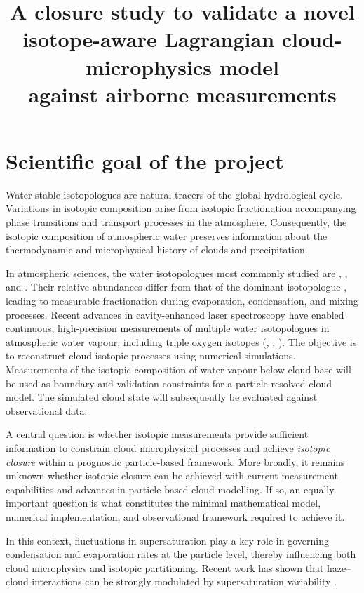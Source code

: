 \documentclass[12pt]{article}
\title{
    \textbf{A closure study to validate a novel isotope-aware
    Lagrangian cloud-microphysics model\\ against airborne measurements}
}
\date{}
\begin{document}
\maketitle
\section{Scientific goal of the project}
Water stable isotopologues are natural tracers of the global hydrological cycle.
Variations in isotopic composition arise from isotopic fractionation accompanying
phase transitions and transport processes in the atmosphere.
Consequently, the isotopic composition of atmospheric water preserves information
about the thermodynamic and microphysical history of clouds
and precipitation.

In atmospheric sciences, the water isotopologues most commonly studied are ,
, and .
Their relative abundances differ from that of the dominant isotopologue ,
leading to measurable fractionation during evaporation, condensation, and mixing processes.
Recent advances in cavity-enhanced laser spectroscopy have enabled continuous,
high-precision measurements of multiple water isotopologues in atmospheric water vapour,
including triple oxygen isotopes (, , ).
The objective is to reconstruct cloud isotopic processes using numerical simulations.
Measurements of the isotopic composition of water vapour below cloud base will be used as boundary
and validation constraints for a particle-resolved cloud model.
The simulated cloud state will subsequently be evaluated against observational data.

A central question is whether isotopic measurements provide sufficient information
to constrain cloud microphysical processes and achieve \emph{isotopic closure} within
a prognostic particle-based framework.
More broadly, it remains unknown whether isotopic closure can be achieved with current
measurement capabilities and advances in particle-based cloud modelling.
If so, an equally important question is what constitutes the minimal mathematical model,
numerical implementation, and observational framework required to achieve it.

In this context, fluctuations in supersaturation play a key role in governing
condensation and evaporation rates at the particle level, thereby influencing
both cloud microphysics and isotopic partitioning.
Recent work has shown that
haze–cloud interactions can be strongly modulated
by supersaturation variability
\parencite{2026_FahandezhSadi_EtAl}.
\end{document}
